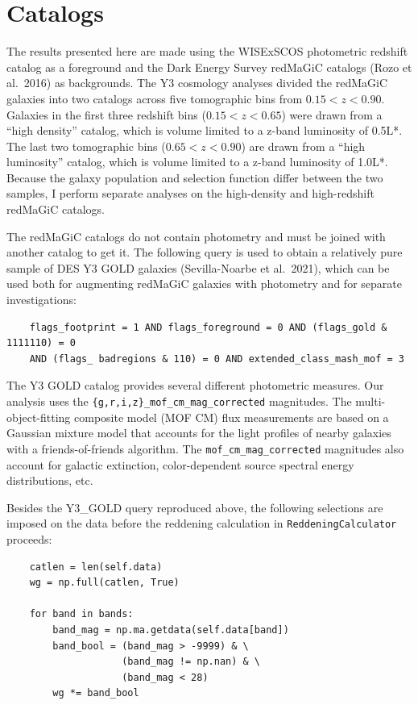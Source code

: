 \documentclass[11pt, oneside]{article}   	%
\begin{document}
\section{Catalogs}\label{sec:catalogs}
The results presented here are made using the WISExSCOS photometric redshift catalog as a foreground and the Dark Energy Survey redMaGiC catalogs (Rozo et al.~2016) as backgrounds. 
The Y3 cosmology analyses divided the redMaGiC galaxies into two catalogs across five tomographic bins from $0.15 < z < 0.90$. Galaxies in the first three redshift bins ($0.15 < z < 0.65$) were drawn from a ``high density'' catalog, which is volume limited to a z-band luminosity of 0.5L*. The last two tomographic bins ($0.65 < z < 0.90$) are drawn from a ``high luminosity'' catalog, which is volume limited to a z-band luminosity of 1.0L*. Because the galaxy population and selection function differ between the two samples, I perform separate analyses on the high-density and high-redshift redMaGiC catalogs. 

The redMaGiC catalogs do not contain photometry and must be joined with another catalog to get it. The following query is used to obtain a relatively pure sample of DES Y3 GOLD galaxies (Sevilla-Noarbe et al.~2021), which can be used both for augmenting redMaGiC galaxies with photometry and for separate investigations:

\begin{verbatim}
    flags_footprint = 1 AND flags_foreground = 0 AND (flags_gold & 1111110) = 0 
    AND (flags_ badregions & 110) = 0 AND extended_class_mash_mof = 3  
\end{verbatim}

The Y3 GOLD catalog provides several different photometric measures. Our analysis uses the \texttt{\{g,r,i,z\}\_mof\_cm\_mag\_corrected} magnitudes. The multi-object-fitting composite model (MOF CM) flux measurements are based on a Gaussian mixture model that accounts for the light profiles of nearby galaxies with a friends-of-friends algorithm. The \texttt{mof\_cm\_mag\_corrected} magnitudes also account for galactic extinction, color-dependent source spectral energy distributions, etc.

Besides the Y3\_GOLD query reproduced above, the following selections are imposed on the data before the reddening calculation in \texttt{ReddeningCalculator} proceeds:

\begin{verbatim}
    catlen = len(self.data)
    wg = np.full(catlen, True)
    
    for band in bands:
        band_mag = np.ma.getdata(self.data[band])
        band_bool = (band_mag > -9999) & \
                    (band_mag != np.nan) & \
                    (band_mag < 28)
        wg *= band_bool
\end{verbatim}
\end{document}
